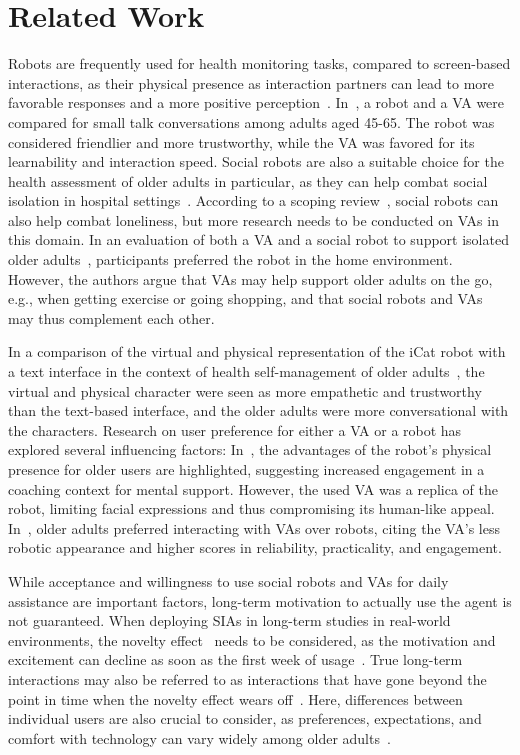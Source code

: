\section{Related Work}
\label{sec:rel-work}
Robots are frequently used for health monitoring tasks, compared to screen-based interactions, as their physical presence as interaction partners can lead to more favorable responses and a more positive perception~\cite{li2015}.
In~\cite{gava2020}, a robot and a \ac{VA} were compared for small talk conversations among adults aged 45-65. 
The robot was considered friendlier and more trustworthy, while the \ac{VA} was favored for its learnability and interaction speed. 
Social robots are also a suitable choice for the health assessment of older adults in particular, as they can help combat social isolation in hospital settings~\cite{sarabia2018}.
According to a scoping review~\cite{gasteiger2021}, social robots can also help combat loneliness, but more research needs to be conducted on \acp{VA} in this domain. 
In an evaluation of both a \ac{VA} and a social robot to support isolated older adults~\cite{sidner2018}, participants preferred the robot in the home environment. 
However, the authors argue that \acp{VA} may help support older adults on the go, e.g., when getting exercise or going shopping, and that social robots and \acp{VA} may thus complement each other. 

In a comparison of the virtual and physical representation of the iCat robot with a text interface in the context of health self-management of older adults~\cite{looije2010}, the virtual and physical character were seen as more empathetic and trustworthy than the text-based interface, and the older adults were more conversational with the characters. 
Research on user preference for either a \ac{VA} or a robot has explored several influencing factors: 
In~\cite{nishio2021}, the advantages of the robot's physical presence for older users are highlighted, suggesting increased engagement in a coaching context for mental support. 
However, the used \ac{VA} was a replica of the robot, limiting facial expressions and thus compromising its human-like appeal. 
In~\cite{esposito2022}, older adults preferred interacting with \acp{VA} over robots, citing the \ac{VA}'s less robotic appearance and higher scores in reliability, practicality, and engagement.

While acceptance and willingness to use social robots and \acp{VA} for daily assistance are important factors, long-term motivation to actually use the agent is not guaranteed. 
When deploying \acp{SIA} in long-term studies in real-world environments, the novelty effect~\cite{smedegaard2019} needs to be considered, as the motivation and excitement can decline as soon as the first week of usage~\cite{ostrowski2022}. 
True long-term interactions may also be referred to as interactions that have gone beyond the point in time when the novelty effect wears off~\cite{leite2013}. 
Here, differences between individual users are also crucial to consider, as preferences, expectations, and comfort with technology can vary widely among older adults~\cite{durick2013, righi2017, schlomann2022}. 

